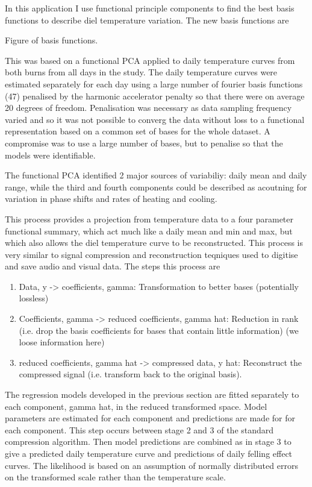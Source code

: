 In this application I use functional principle components to find the best basis functions to describe diel temperature variation.  The new basis functions are

Figure of basis functions. 

This was based on a functional PCA applied to daily temperature curves from both burns from all days in the study.  The daily temperature curves were estimated separately for each day using a large number of fourier basis functions (47) penalised by the harmonic accelerator penalty so that there were on average 20 degrees of freedom.  Penalisation was necessary as data sampling frequency varied and so it was not possible to converg the data without loss to a functional representation based on a common set of bases for the whole dataset.  A compromise was to use a large number of bases, but to penalise so that the models were identifiable.

The functional PCA identified 2 major sources of variabiliy: daily mean and daily range, while the third and fourth components could be described as acoutning for variation in phase shifts and rates of heating and cooling.

This process provides a projection from temperature data to a four parameter functional summary, which act much like a daily mean and min and max, but which also allows the diel temperature curve to be reconstructed. This process is very similar to signal compression and reconstruction teqniques used to digitise and save audio and visual data.  The steps this process are

\begin{enumerate}
\item Data, y -> coefficients, gamma: Transformation to better bases (potentially lossless)
\item Coefficients, gamma -> reduced coefficients, gamma hat: Reduction in rank (i.e. drop the basis coefficients for bases that contain little information) (we loose information here)
\item reduced coefficients, gamma hat -> compressed data, y hat: Reconstruct the compressed signal (i.e. transform back to the original basis). 
\end{enumerate}

The regression models developed in the previous section are fitted separately to each component, gamma hat, in the reduced transformed space.  Model parameters are estimated for each component and predictions are made for for each component.  This step occurs between stage 2 and 3 of the standard compression algorithm. Then model predictions are combined as in stage 3 to give a predicted daily temperature curve and predictions of daily felling effect curves.  The likelihood is based on an assumption of normally distributed errors on the transformed scale rather than the temperature scale.

